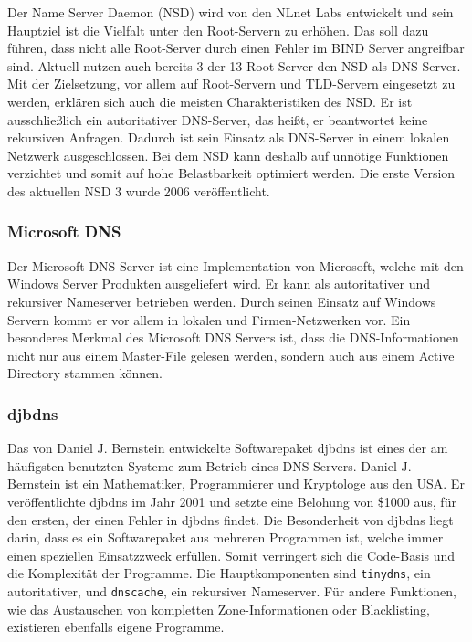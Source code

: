 \documentclass[a4paper, 12pt, BCOR10mm, DIV12, toc=bibliography, toc=listof, german]{scrbook}
\begin{document}
				Der Name Server Daemon (NSD) \cite{nsd} wird von den NLnet Labs entwickelt und sein
				Hauptziel ist die Vielfalt unter den Root-Servern zu erhöhen.  Das soll dazu führen, dass
				nicht alle Root-Server durch einen Fehler im BIND Server angreifbar sind. Aktuell nutzen
				auch bereits 3 der 13 Root-Server den NSD als DNS-Server.  Mit der Zielsetzung, vor allem
				auf Root-Servern und TLD-Servern eingesetzt zu werden, erklären sich auch die meisten
				Charakteristiken des NSD. Er ist ausschließlich ein autoritativer DNS-Server, das heißt, er
				beantwortet keine rekursiven Anfragen. Dadurch ist sein Einsatz als DNS-Server in einem
				lokalen Netzwerk ausgeschlossen. Bei dem NSD kann deshalb auf unnötige Funktionen verzichtet
				und somit auf hohe Belastbarkeit optimiert werden. Die erste Version des aktuellen NSD 3
				wurde 2006 veröffentlicht.


				\subsubsection*{Microsoft DNS} %

				Der Microsoft DNS Server \cite{msdns} ist eine Implementation von Microsoft, welche mit den
				Windows Server Produkten ausgeliefert wird. Er kann als autoritativer und rekursiver
				Nameserver betrieben werden. Durch seinen Einsatz auf Windows Servern kommt er vor allem in
				lokalen und Firmen-Netzwerken vor. Ein besonderes Merkmal des Microsoft DNS Servers ist,
				dass die DNS-Informationen nicht nur aus einem Master-File gelesen werden, sondern auch aus
				einem Active Directory stammen können.


				\subsubsection*{djbdns} %

				Das von Daniel J. Bernstein entwickelte Softwarepaket djbdns \cite{djbdns} ist eines der am
				häufigsten benutzten Systeme zum Betrieb eines DNS-Servers. Daniel J.  Bernstein ist ein
				Mathematiker, Programmierer und Kryptologe aus den USA. Er veröffentlichte djbdns im Jahr
				2001 und setzte eine Belohung \cite{guarantee} von \$1000 aus, für den ersten, der einen
				Fehler in djbdns findet. Die Besonderheit von djbdns liegt darin, dass es ein Softwarepaket
				aus mehreren Programmen ist, welche immer einen speziellen Einsatzzweck erfüllen. Somit
				verringert sich die Code-Basis und die Komplexität der Programme. Die Hauptkomponenten sind
				\texttt{tinydns}, ein autoritativer, und \texttt{dnscache}, ein rekursiver
				Nameserver. Für andere Funktionen, wie das Austauschen von kompletten Zone-Informationen oder
				Blacklisting, existieren ebenfalls eigene Programme.
\end{document}

